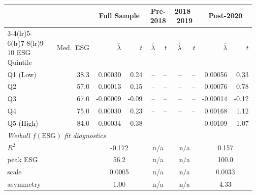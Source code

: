 \begin{tabular}{lrrrrrrrrr}
\toprule
& & \multicolumn{2}{c}{Full Sample} & \multicolumn{2}{c}{Pre-2018} & \multicolumn{2}{c}{2018--2019} & \multicolumn{2}{c}{Post-2020} \\
\cmidrule(lr){3-4}\cmidrule(lr){5-6}\cmidrule(lr){7-8}\cmidrule(lr){9-10}
ESG Quintile & Med.\ ESG & $\hat{\lambda}$ & $t$ & $\hat{\lambda}$ & $t$ & $\hat{\lambda}$ & $t$ & $\hat{\lambda}$ & $t$ \\
\midrule
Q1 (Low) & 38.3 & 0.00030 & 0.24 & -- & -- & -- & -- & 0.00056 & 0.33 \\
Q2 & 57.0 & 0.00013 & 0.15 & -- & -- & -- & -- & 0.00076 & 0.78 \\
Q3 & 67.0 & -0.00009 & -0.09 & -- & -- & -- & -- & -0.00014 & -0.12 \\
Q4 & 75.0 & 0.00030 & 0.23 & -- & -- & -- & -- & 0.00168 & 1.12 \\
Q5 (High) & 84.0 & 0.00034 & 0.38 & -- & -- & -- & -- & 0.00109 & 1.07 \\
\midrule
\multicolumn{10}{l}{\textit{Weibull $f(\mathrm{ESG})$ fit diagnostics}} \\
$R^2$ & & \multicolumn{2}{c}{-0.172} & \multicolumn{2}{c}{n/a} & \multicolumn{2}{c}{n/a} & \multicolumn{2}{c}{0.157} \\
peak ESG & & \multicolumn{2}{c}{56.2} & \multicolumn{2}{c}{n/a} & \multicolumn{2}{c}{n/a} & \multicolumn{2}{c}{100.0} \\
scale & & \multicolumn{2}{c}{0.0005} & \multicolumn{2}{c}{n/a} & \multicolumn{2}{c}{n/a} & \multicolumn{2}{c}{0.0033} \\
asymmetry & & \multicolumn{2}{c}{1.00} & \multicolumn{2}{c}{n/a} & \multicolumn{2}{c}{n/a} & \multicolumn{2}{c}{4.33} \\
\bottomrule
\end{tabular}